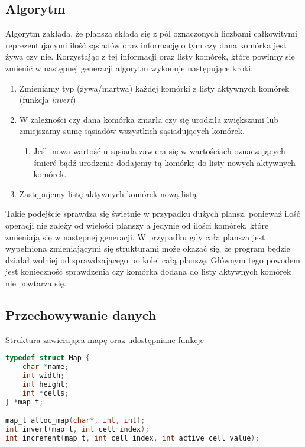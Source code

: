 \documentclass{article}
\begin{document}
\subsection{Algorytm}

Algorytm zakłada, że plansza składa się z pól oznaczonych liczbami całkowitymi reprezentującymi ilość sąsiadów oraz informację o tym czy dana komórka jest żywa czy nie. Korzystając z tej informacji oraz listy komórek, które powinny się zmienić w następnej generacji algorytm wykonuje następujące kroki:

\begin{enumerate}
    \item Zmieniamy typ (żywa/martwa) każdej komórki z listy aktywnych komórek (funkcja \textit{invert})
    \item W zależności czy dana komórka zmarła czy się urodziła zwiększami lub zmiejszamy sumę sąsiadów wszystkich sąsiadujących komórek.
        \begin{enumerate}
        \item Jeśli nowa wartość u sąsiada zawiera się w wartościach oznaczających śmierć bądź urodzenie dodajemy tą komórkę do listy nowych aktywnych komórek.
    \end{enumerate}
    \item Zastępujemy listę aktywnych komórek nową listą
\end{enumerate}

Takie podejście sprawdza się świetnie w przypadku dużych plansz, ponieważ ilość operacji nie zależy od wielości planszy a jedynie od ilości komórek, które zmieniają się w następnej generacji. W przypadku gdy cała plansza jest wypełniona zmieniającymi się strukturami może okazać się, że program będzie działał wolniej od sprawdzającego po kolei całą planszę. Głównym tego powodem jest konieczność sprawdzenia czy komórka dodana do listy aktywnych komórek nie powtarza się.

\subsection{Przechowywanie danych}

Struktura zawierająca mapę oraz udostępniane funkcje
\begin{lstlisting}[language=C]
typedef struct Map {
    char *name;
    int width;
    int height;
    int *cells;
} *map_t;

map_t alloc_map(char*, int, int);
int invert(map_t, int cell_index);
int increment(map_t, int cell_index, int active_cell_value);
\end{lstlisting}
\end{document}
